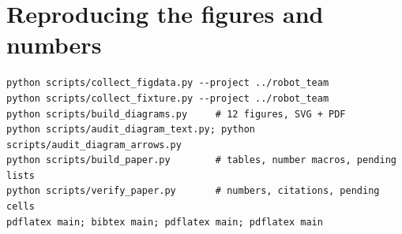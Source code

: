 \begin{table}[h]
\centering\small

\caption{Plan verification against a planner wrapped to inject errors with probability 0.5 (clean Eyes).}
\end{table}
\begin{table}[h]
\centering\small

\caption{Communication modes (noisy Eyes): message tokens are a four-characters-per-token proxy.}
\end{table}
\begin{table}[h]
\centering\small

\caption{Heavy Eye mass noise ($\sigma=0.45$ on both Eyes): weighing probe, challenge only, and no fix.}
\end{table}
\begin{table}[h]
\centering\small

\caption{Effect of the look request when each Eye omits an item with probability 0.4.}
\end{table}
\begin{table}[h]
\centering\small

\caption{Oracle gain $G$ for Eye~A by injected fault type, with the breakdown by field: the estimator puts the gain in the field that carries the fault.}
\end{table}

\section{Reproducing the figures and numbers}\label{app:repro}
\begin{table}[h]
\centering\small

\caption{Reproducibility facts.}
\end{table}
\begin{small}
\begin{verbatim}
python scripts/collect_figdata.py --project ../robot_team
python scripts/collect_fixture.py --project ../robot_team
python scripts/build_diagrams.py     # 12 figures, SVG + PDF
python scripts/audit_diagram_text.py; python scripts/audit_diagram_arrows.py
python scripts/build_paper.py        # tables, number macros, pending lists
python scripts/verify_paper.py       # numbers, citations, pending cells
pdflatex main; bibtex main; pdflatex main; pdflatex main
\end{verbatim}
\end{small}
